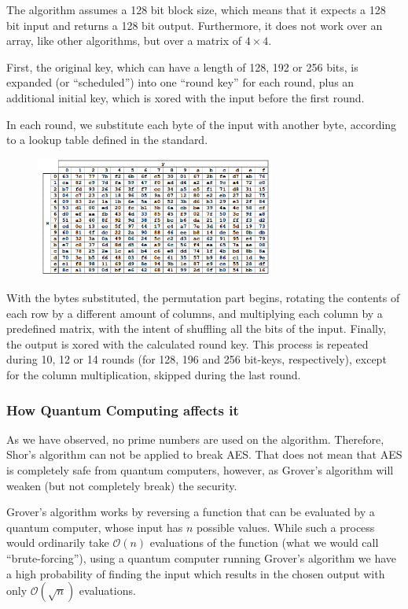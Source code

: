 The algorithm assumes a 128 bit block size, which means that it expects a 128
bit input and returns a 128 bit output. Furthermore, it does not work over an
array, like other algorithms, but over a matrix of $4 \times 4$.

First, the original key, which can have a length of 128, 192 or 256 bits, is
expanded (or “scheduled”) into one “round key” for each round, plus an
additional initial key, which is xored with the input before the first round.

In each round, we substitute each byte of the input with another byte, according
to a lookup table defined in the standard.

\begin{figure}[H]
    \centering
    \includegraphics[width=0.7\textwidth]{images/aes-table}
\end{figure}

With the bytes substituted, the permutation part begins, rotating the contents
of each row by a different amount of columns, and multiplying each column by a
predefined matrix, with the intent of shuffling all the bits of the input.
Finally, the output is xored with the calculated round key. This process is
repeated during 10, 12 or 14 rounds (for 128, 196 and 256 bit-keys,
respectively), except for the column multiplication, skipped during the last
round.

\subsubsection{How Quantum Computing affects it}

As we have observed, no prime numbers are used on the algorithm. Therefore,
Shor's algorithm can not be applied to break AES. That does not mean that AES is
completely safe from quantum computers, however, as Grover's algorithm will
weaken (but not completely break) the security.

Grover's algorithm works by reversing a function that can be evaluated by a
quantum computer, whose input has $n$ possible values. While such a process would
ordinarily take $\mathcal{O}(n)$ evaluations of the function (what we would call
“brute-forcing”), using a quantum computer running Grover's algorithm we have a
high probability of finding the input which results in the chosen output with
only $\mathcal{O}(\sqrt{n})$ evaluations.

